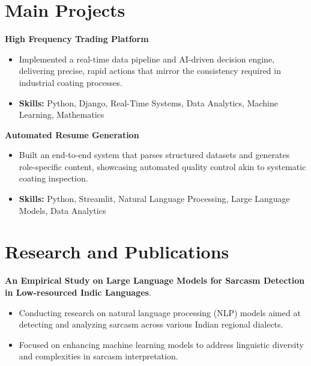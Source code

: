\documentclass[a4paper,11pt]{article}
\begin{document}
\section{\textbf{Main Projects}}

\vspace{1mm}
  \textbf{High Frequency Trading Platform  }
\vspace{-1.5mm} %
\begin{itemize}
  \item Implemented a real-time data pipeline and AI-driven decision engine, delivering precise, rapid actions that mirror the consistency required in industrial coating processes.
\vspace{-3mm}
  \item \textbf{Skills:} Python, Django, Real-Time Systems, Data Analytics, Machine Learning, Mathematics
\end{itemize}


\vspace{1mm}
   \textbf{Automated Resume Generation }
\vspace{-1.5mm} %
\begin{itemize}
  \item Built an end-to-end system that parses structured datasets and generates role-specific content, showcasing automated quality control akin to systematic coating inspection.
\vspace{-3mm}
  \item \textbf{Skills:} Python, Streamlit, Natural Language Processing, Large Language Models, Data Analytics
\end{itemize}



\section{\textbf{Research and Publications} \hfill }
\vspace{1mm}
  \textbf{An Empirical Study on Large Language Models for Sarcasm Detection in Low-resourced Indic Languages}.
\vspace{-1mm} %
\begin{itemize}
  \item Conducting research on natural language processing (NLP) models aimed at detecting and analyzing sarcasm across various Indian regional dialects.
\vspace{-3mm}
  \item Focused on enhancing machine learning models to address linguistic diversity and complexities in sarcasm interpretation.
\end{itemize}
\end{document}
